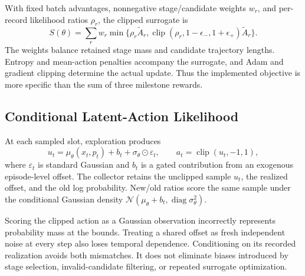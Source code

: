With fixed batch advantages, nonnegative stage/candidate weights $w_r$, and per-record likelihood ratios $\rho_r$, the clipped surrogate is
\begin{equation}
S(\theta)=\sum_r w_r\min\{\rho_r\widetilde A_r,
\operatorname{clip}(\rho_r,1-\epsilon_-,1+\epsilon_+)\widetilde A_r\}.
\end{equation}
The weights balance retained stage mass and candidate trajectory lengths. Entropy and mean-action penalties accompany the surrogate, and Adam and gradient clipping determine the actual update. Thus the implemented objective is more specific than the sum of three milestone rewards.

\subsection{Conditional Latent-Action Likelihood}
At each sampled slot, exploration produces
\begin{equation}
u_t=\mu_\theta(x_t,p_t)+b_t+\sigma_\theta\odot\varepsilon_t,
\qquad a_t=\operatorname{clip}(u_t,-1,1),
\end{equation}
where $\varepsilon_t$ is standard Gaussian and $b_t$ is a gated contribution from an exogenous episode-level offset. The collector retains the unclipped sample $u_t$, the realized offset, and the old log probability. New/old ratios score the same sample under the conditional Gaussian density $\mathcal N(\mu_\theta+b_t,\operatorname{diag}\sigma_\theta^2)$.

Scoring the clipped action as a Gaussian observation incorrectly represents probability mass at the bounds. Treating a shared offset as fresh independent noise at every step also loses temporal dependence. Conditioning on its recorded realization avoids both mismatches. It does not eliminate biases introduced by stage selection, invalid-candidate filtering, or repeated surrogate optimization.

